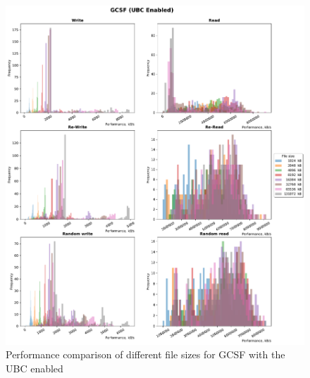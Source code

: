 \begin{figure}[!htb]
	\label{fig:bench_gcsf_with_cache}
	\begin{center}
		\includegraphics[width=1.0\textwidth]{figures.nosync/benchmarking/GCSF/GCSF-UBC Enabled-hist.pdf}
	\end{center}
	\caption[Performance comparison for GCSF with the UBC enabled]{Performance comparison of different file sizes for GCSF with the UBC enabled}
\end{figure}
\clearpage
